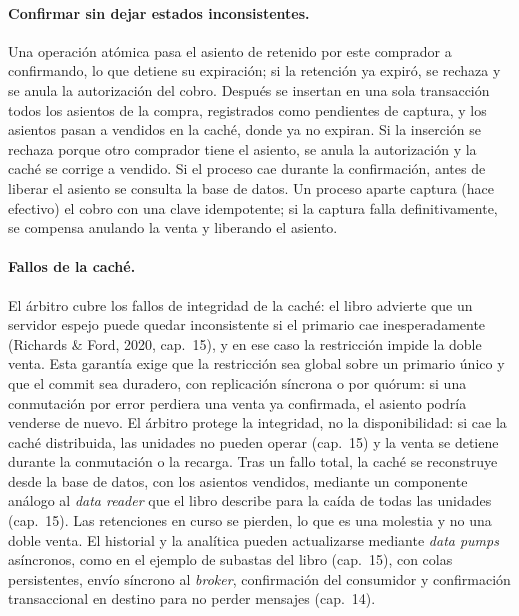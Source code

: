\paragraph{Confirmar sin dejar estados inconsistentes.}
Una operación atómica pasa el asiento de retenido por este comprador a confirmando, lo
que detiene su expiración; si la retención ya expiró, se rechaza y se anula la
autorización del cobro. Después se insertan en una sola transacción todos los asientos
de la compra, registrados como pendientes de captura, y los asientos pasan a vendidos
en la caché, donde ya no expiran. Si la inserción se rechaza porque otro comprador tiene
el asiento, se anula la autorización y la caché se corrige a vendido. Si el proceso cae
durante la confirmación, antes de liberar el asiento se consulta la base de datos. Un
proceso aparte captura (hace efectivo) el cobro con una clave idempotente; si la captura
falla definitivamente, se compensa anulando la venta y liberando el asiento.

\paragraph{Fallos de la caché.}
El árbitro cubre los fallos de integridad de la caché: el libro advierte que un servidor
espejo puede quedar inconsistente si el primario cae inesperadamente (Richards \& Ford,
2020, cap.~15), y en ese caso la restricción impide la doble venta. Esta garantía exige
que la restricción sea global sobre un primario único y que el commit sea duradero, con
replicación síncrona o por quórum: si una conmutación por error perdiera una venta ya
confirmada, el asiento podría venderse de nuevo. El árbitro protege la integridad, no la
disponibilidad: si cae la caché distribuida, las unidades no pueden operar (cap.~15) y
la venta se detiene durante la conmutación o la recarga. Tras un fallo total, la caché
se reconstruye desde la base de datos, con los asientos vendidos, mediante un componente
análogo al \emph{data reader} que el libro describe para la caída de todas las unidades
(cap.~15). Las retenciones en curso se pierden, lo que es una molestia y no una doble
venta. El historial y la analítica pueden actualizarse mediante \emph{data pumps}
asíncronos, como en el ejemplo de subastas del libro (cap.~15), con colas persistentes,
envío síncrono al \emph{broker}, confirmación del consumidor y confirmación
transaccional en destino para no perder mensajes (cap.~14).

